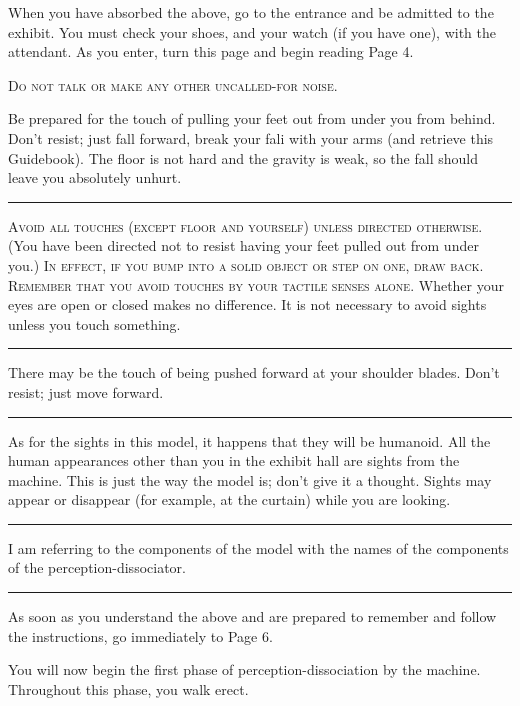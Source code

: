 \documentclass[10pt,twoside]{memoir}
\begin{document}
\begin{enumerate}
{\begin{enumerate}
\begin{sysrules}
\begin{sysrules}
\begin{sysrules}
\begin{sysrules}
{\begin{enumerate}
\begin{sysrules}
When you have absorbed the above, go to the entrance and be admitted 
to the exhibit. You must check your shoes, and your watch (if you have 
one), with the attendant. As you enter, turn this page and begin reading Page 
4. 

\clearpage

\textsc{Do not talk or make any other uncalled-for noise.}


Be prepared for the touch of pulling your feet out from under you 
from behind. Don't resist; just fall forward, break your fali with your arms 
(and retrieve this Guidebook). The floor is not hard and the gravity is weak, 
so the fall should leave you absolutely unhurt. 

\plainbreak{2}

\textsc{Avoid all touches (except floor and yourself) unless directed otherwise.}
(You have been directed not to resist having your 
feet pulled out from under you.) 
\textsc{In effect, if you bump into a solid object or step on one, draw back. Remember
that you avoid touches by your tactile senses alone.}
Whether your eyes are open or closed makes no difference. It is not necessary to avoid 
sights unless you touch something. 

\plainbreak{2}

There may be the touch of being pushed forward at your shoulder 
blades. Don't resist; just move forward. 

\plainbreak{2}

As for the sights in this model, it happens that they will be humanoid. 
All the human appearances other than you in the exhibit hall are sights from 
the machine. This is just the way the model is; don't give it a thought. Sights 
may appear or disappear (for example, at the curtain) while you are looking. 

\plainbreak{2}

I am referring to the components of the model with the names of the 
components of the perception-dissociator. 

\plainbreak{2}

As soon as you understand the above and are prepared to remember 
and follow the instructions, go immediately to Page 6. 

\clearpage


\clearpage

You will now begin the first phase of perception-dissociation by the 
machine. Throughout this phase, you walk erect. 


\end{sysrules}
\end{enumerate}}
\end{sysrules}
\end{sysrules}
\end{sysrules}
\end{sysrules}
\end{enumerate}}
\end{enumerate}
\end{document}
